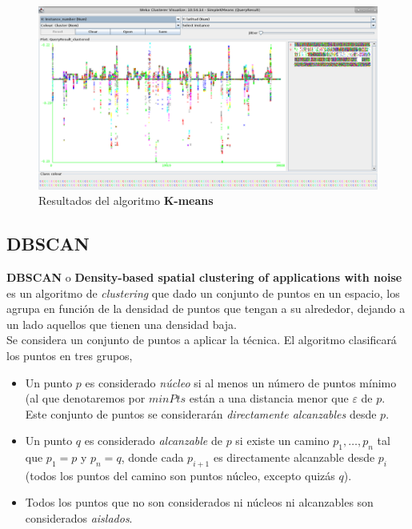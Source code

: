 \documentclass[a4paper, 12pt]{article}
\begin{document}
\begin{figure}[!htbp]
	\begin{center}
	\includegraphics[scale=.4]{wekaKMeansResults.png}
	\end{center}
	\caption{Resultados del algoritmo \textbf{K-means}}
\end{figure}


\pagebreak
\subsection{DBSCAN}

\textbf{DBSCAN} o \textbf{Density-based spatial clustering of applications with noise} es un algoritmo de \textit{clustering} que dado un conjunto de puntos en un espacio, los agrupa en funci\'on de la densidad de puntos que tengan a su alrededor, dejando a un lado aquellos que tienen una densidad baja. \\

Se considera un conjunto de puntos a aplicar la t\'ecnica. El algoritmo clasificar\'a los puntos en tres grupos, 

\begin{itemize}
	\item Un punto $p$ es considerado \textit{n\'ucleo} si al menos un n\'umero de puntos m\'inimo (al que denotaremos por $minPts$ est\'an a una distancia menor que $\varepsilon$ de $p$. Este conjunto de puntos se considerar\'an \textit{directamente alcanzables} desde $p$.
	\item Un punto $q$ es considerado \textit{alcanzable} de $p$ si existe un camino $p_1, \ldots, p_n$ tal que $p_1=p$ y $p_n=q$, donde cada $p_{i+1}$ es directamente alcanzable desde $p_i$ (todos los puntos del camino son puntos n\'ucleo, excepto quiz\'as $q$).
	\item Todos los puntos que no son considerados ni n\'ucleos ni alcanzables son considerados \textit{aislados}.
\end{itemize}
\end{document}
